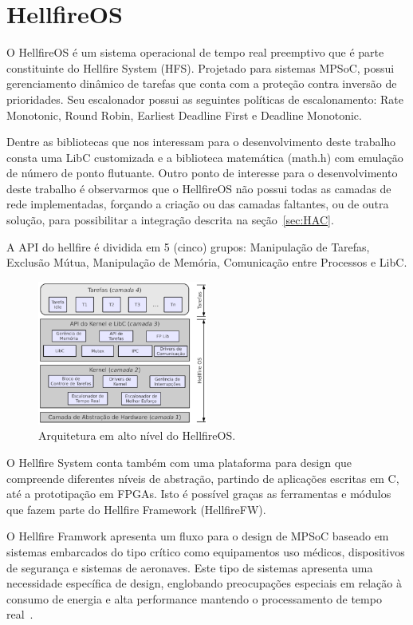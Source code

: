 \section{HellfireOS}
\label{sec:HellfireOS}
O HellfireOS é um sistema operacional de tempo real preemptivo que é parte constituinte
do Hellfire System (HFS). Projetado para sistemas MPSoC, possui gerenciamento
dinâmico de tarefas que conta com a proteção contra inversão de prioridades. Seu escalonador
possui as seguintes políticas de escalonamento: Rate Monotonic, Round Robin, Earliest Deadline First e Deadline Monotonic.

Dentre as bibliotecas que nos interessam para o desenvolvimento deste trabalho consta
uma LibC customizada e a biblioteca matemática (math.h) com emulação de número de ponto
flutuante. Outro ponto de interesse para o desenvolvimento deste trabalho é observarmos
que o HellfireOS não possui todas as camadas de rede implementadas, forçando a criação
ou das camadas faltantes, ou de outra solução, para possibilitar a integração descrita
na seção~\ref{sec:HAC}.

A API do hellfire é dividida em 5 (cinco) grupos: Manipulação de Tarefas, Exclusão Mútua,
Manipulação de Memória, Comunicação entre Processos e LibC.

\begin{figure}[H]
	\centering
		\includegraphics[width=0.5\textwidth]{fig/HellfireArch.png}
	\caption{Arquitetura em alto nível do HellfireOS.}
\end{figure}

O Hellfire System conta também com uma plataforma para design que compreende diferentes
níveis de abstração, partindo de aplicações escritas em C, até a prototipação em FPGAs.
Isto é possível graças as ferramentas e módulos que fazem parte do Hellfire Framework (HellfireFW).

O Hellfire Framwork apresenta um fluxo para o design de MPSoC baseado em sistemas embarcados do tipo crítico
como equipamentos uso médicos, dispositivos de segurança e sistemas de aeronaves. Este tipo de sistemas
apresenta uma necessidade específica de design, englobando preocupações especiais em relação à consumo de
energia e alta performance mantendo o processamento de tempo real~\cite{5450495}.
